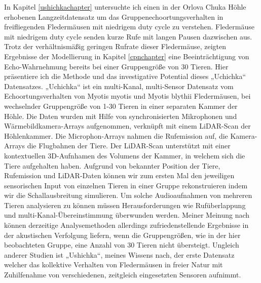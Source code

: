 \documentclass[
]{book}
\begin{document}
In Kapitel \ref{ushichkachapter} untersuchte ich einen in der Orlova Chuka Höhle erhobenen Langzeitdatensatz um das Gruppenechoortungsverhalten in freifliegenden Fledermäusen mit niedrigem duty cycle zu verstehen. Fledermäuse mit niedrigem duty cycle senden kurze Rufe mit langen Pausen dazwischen aus. Trotz der verhältnismäßig geringen Rufrate dieser Fledermäuse, zeigten Ergebnisse der Modellierung in Kapitel \ref{cpnchapter} eine Beeinträchtigung von Echo-Wahrnehmung bereits bei einer Gruppengröße von 30 Tieren. Hier präsentiere ich die Methode und das investigative Potential dieses „Uchichka`` Datensatzes. „Uchichka`` ist ein multi-Kanal, multi-Sensor Datensatz vom Echoortungsverhalten von Myotis myotis und Myotis blythii Fledermäusen, bei wechselnder Gruppengröße von 1-30 Tieren in einer separaten Kammer der Höhle. Die Daten wurden mit Hilfe von synchronisierten Mikrophonen und Wärmebildkamera-Arrays aufgenommen, verknüpft mit einem LiDAR-Scan der Höhlenkammer. Die Microphon-Arrays nahmen die Rufemission auf, die Kamera-Arrays die Flugbahnen der Tiere. Der LiDAR-Scan unterstützt mit einer kontextuellen 3D-Aufnhamen des Volumens der Kammer, in welchem sich die Tiere aufgehalten haben. Aufgrund von bekannter Position der Tiere, Rufemission und LiDAR-Daten können wir zum ersten Mal den jeweiligen sensorischen Input von einzelnen Tieren in einer Gruppe rekonstruieren indem wir die Schallausbreitung simulieren. Um solche Audioaufnahmen von mehreren Tieren analysieren zu können müssen Herausforderungen wie Rufüberlappung und multi-Kanal-Übereinstimmung überwunden werden. Meiner Meinung nach können derzeitige Analysemethoden allerdings zufriedenstellende Ergebnisse in der akustischen Verfolgung liefern, wenn die Gruppengrößen, wie in der hier beobachteten Gruppe, eine Anzahl von 30 Tieren nicht übersteigt. Ungleich anderer Studien ist „Ushichka``, meines Wissens nach, der erste Datensatz welcher das kollektive Verhalten von Fledermäusen in freier Natur mit Zuhilfenahme von verschiedenen, zeitgleich eingesetzten Sensoren aufnimmt.
\end{document}
